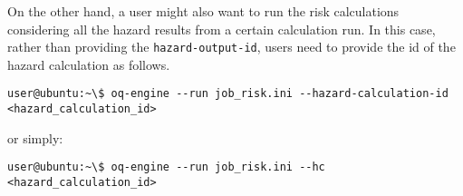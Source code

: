 On the other hand, a user might also want to run the risk calculations
considering all the hazard results from a certain calculation run. In this
case, rather than providing the \verb+hazard-output-id+, users need to provide
the id of the hazard calculation as follows.

\begin{Verbatim}[frame=single, commandchars=\\\{\}, samepage=true]
user@ubuntu:~\$ oq-engine --run job_risk.ini --hazard-calculation-id <hazard_calculation_id>
\end{Verbatim}

or simply:

\begin{Verbatim}[frame=single, commandchars=\\\{\}, samepage=true]
user@ubuntu:~\$ oq-engine --run job_risk.ini --hc <hazard_calculation_id>
\end{Verbatim}